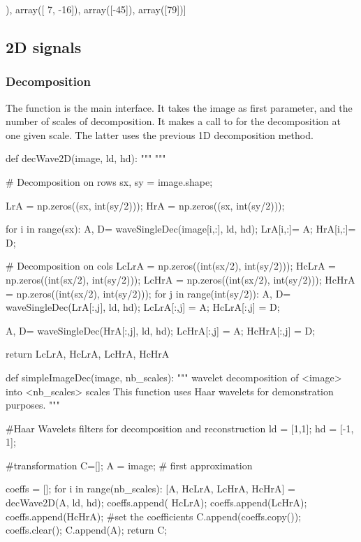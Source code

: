 \begin{sh}
[4, 8, 2, 3, 5, 18, 19, 20]
[array([ -4,  -1, -13,  -1]), array([  7, -16]), array([-45]), array([79])]
\end{sh}


\subsection{2D signals}
\subsubsection{Decomposition}
The  function is the main interface. It takes the image as first parameter, and the number of scales of decomposition. It makes a call to  for the decomposition at one given scale. The latter uses the previous 1D decomposition method.

\begin{python}
def decWave2D(image, ld, hd):
    """
    """

    # Decomposition on rows
    sx, sy = image.shape;

    LrA = np.zeros((sx, int(sy/2)));
    HrA = np.zeros((sx, int(sy/2)));
    
    for i in range(sx):
        A, D= waveSingleDec(image[i,:], ld, hd);
        LrA[i,:]= A;
        HrA[i,:]= D;

    # Decomposition on cols
    LcLrA = np.zeros((int(sx/2), int(sy/2)));
    HcLrA = np.zeros((int(sx/2), int(sy/2)));
    LcHrA = np.zeros((int(sx/2), int(sy/2)));
    HcHrA = np.zeros((int(sx/2), int(sy/2)));
    for j in range(int(sy/2)):
        A, D= waveSingleDec(LrA[:,j], ld, hd);
        LcLrA[:,j] = A;
        HcLrA[:,j] = D;
        
        A, D= waveSingleDec(HrA[:,j], ld, hd);
        LcHrA[:,j] = A;
        HcHrA[:,j] = D;
        
    return LcLrA, HcLrA, LcHrA, HcHrA
\end{python}

\begin{python}
def simpleImageDec(image, nb_scales):
    """
    wavelet decomposition of <image> into <nb_scales> scales
    This function uses Haar wavelets for demonstration purposes.
    """

    #Haar Wavelets filters for decomposition and reconstruction
    ld = [1,1];
    hd = [-1, 1];

    #transformation
    C=[];
    A = image; # first approximation

    coeffs = [];
    for i in range(nb_scales):
        [A, HcLrA, LcHrA, HcHrA] = decWave2D(A, ld, hd);
        coeffs.append( HcLrA);
        coeffs.append(LcHrA);
        coeffs.append(HcHrA);
        #set the coefficients
        C.append(coeffs.copy());
        coeffs.clear();
    C.append(A);
    return C;
\end{python}


